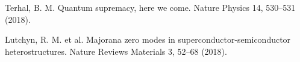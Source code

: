 \newpage
\begin{thebibliography}{99}

  Terhal,
  B. M. Quantum supremacy,
  here we come. Nature Physics 14,
  530–531 (2018).

  Lutchyn,
  R. M. et al. Majorana zero modes in superconductor-semiconductor heterostructures. Nature Reviews Materials 3,
  52–68 (2018).

\end{thebibliography}
